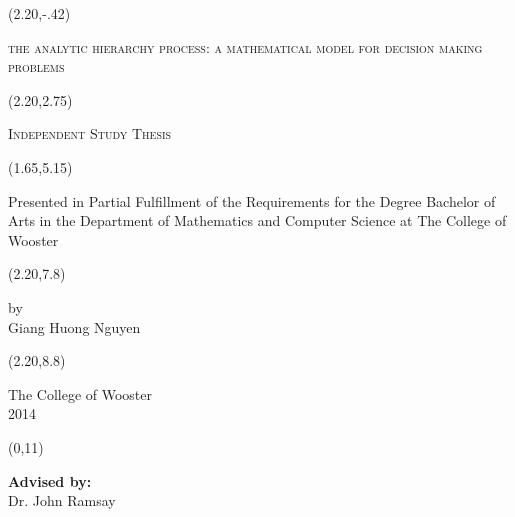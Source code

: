 \documentclass[12pt,twoside]{book}
\theoremstyle{remark} %
\theoremstyle{definition} %
\begin{document}
\frontmatter

\begin{titlepage}
\let\footnoterule\relax
{\def\\{\noexpand\\}
\global\gdef\@titl@{{\@title}}}%
{
\begin{textblock}{6}(2.20,-.42)
\begin{singlespace}
\begin{center}
{\scshape\Large the analytic hierarchy process: a mathematical model for decision making problems}
\end{center}
\end{singlespace}%
\end{textblock}}
\begin{textblock}{6}(2.20,2.75)
\begin{center}
{\scshape Independent Study Thesis}
\end{center}
\end{textblock}  
\begin{textblock}{7}(1.65,5.15)
\begin{singlespace}
\begin{center}
Presented in Partial Fulfillment of the Requirements for
the Degree Bachelor of Arts in the
 Department of Mathematics and Computer Science at The College of Wooster
\end{center}
\end{singlespace}
\end{textblock}
\begin{textblock}{6}(2.20,7.8)
\begin{singlespace}
\begin{center}
by \\
Giang Huong Nguyen\\
\end{center}
\end{singlespace}
\end{textblock}
\bigskip

\begin{textblock}{6}(2.20,8.8)
{\def\baselinestretch{1}\normalsize
\begin{center}
The College of Wooster\\
2014
\end{center}}%
\end{textblock}
\begin{textblock}{6}(0,11)
\noindent
\hspace{1pt}
\begin{minipage}[b]{\hsize}
\begin{flushleft}
{\bfseries Advised by:} \\
Dr. John Ramsay
\end{flushleft}
\end{minipage}%
\end{textblock}
  \end{titlepage}%
  
\end{document}
